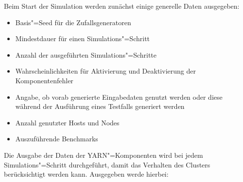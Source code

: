 Beim Start der Simulation werden zunächst einige generelle Daten ausgegeben:

\begin{itemize}
    \item Basis"=Seed für die Zufallsgeneratoren
    \item Mindestdauer für einen Simulations"=Schritt
    \item Anzahl der ausgeführten Simulations"=Schritte
    \item Wahrscheinlichkeiten für Aktivierung und Deaktivierung der Komponentenfehler
    \item Angabe, ob vorab generierte Eingabedaten genutzt werden oder diese während der Ausführung eines Testfalls generiert werden
    \item Anzahl genutzter Hosts und Nodes
    \item Auszuführende Benchmarks    
\end{itemize}

Die Ausgabe der Daten der YARN"=Komponenten wird bei jedem Simulations"=Schritt durchgeführt, damit das Verhalten des Clusters berücksichtigt werden kann.
Ausgegeben werde hierbei:

